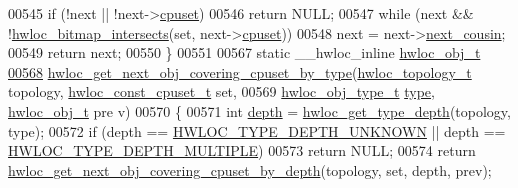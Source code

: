 \begin{DoxyCode}
00545   \textcolor{keywordflow}{if} (!next || !next->\hyperlink{a00016_a67925e0f2c47f50408fbdb9bddd0790f}{cpuset})
00546     \textcolor{keywordflow}{return} NULL;
00547   \textcolor{keywordflow}{while} (next && !\hyperlink{a00065_ga575c27953709a8cb9a047aae65157526}{hwloc_bitmap_intersects}(\textcolor{keyword}{set}, next->\hyperlink{a00016_a67925e0f2c47f50408fbdb9bddd0790f}{cpuset}))
00548     next = next->\hyperlink{a00016_a85a788017457129589318b6c39451acf}{next_cousin};
00549   \textcolor{keywordflow}{return} next;
00550 \}
00551 
00567 \textcolor{keyword}{static} \_\_hwloc\_inline \hyperlink{a00016}{hwloc_obj_t}
\hypertarget{a00031_source_l00568}{}\hyperlink{a00056_ga5915ea30f326676b3a4cfff371ce04d1}{00568} \hyperlink{a00056_ga5915ea30f326676b3a4cfff371ce04d1}{hwloc_get_next_obj_covering_cpuset_by_type}(\hyperlink{a00039_ga9d1e76ee15a7dee158b786c30b6a6e38}{hwloc_topology_t} topology, 
      \hyperlink{a00040_ga1f784433e9b606261f62d1134f6a3b25}{hwloc_const_cpuset_t} \textcolor{keyword}{set},
00569                                            \hyperlink{a00041_gacd37bb612667dc437d66bfb175a8dc55}{hwloc_obj_type_t} \hyperlink{a00016_acc4f0803f244867e68fe0036800be5de}{type}, \hyperlink{a00016}{hwloc_obj_t} pre
      v)
00570 \{
00571   \textcolor{keywordtype}{int} \hyperlink{a00016_a9d82690370275d42d652eccdea5d3ee5}{depth} = \hyperlink{a00046_gaea7c64dd59467f5201ba87712710b14d}{hwloc_get_type_depth}(topology, type);
00572   \textcolor{keywordflow}{if} (depth == \hyperlink{a00046_ggaf4e663cf42bbe20756b849c6293ef575a0565ab92ab72cb0cec91e23003294aad}{HWLOC_TYPE_DEPTH_UNKNOWN} || depth == \hyperlink{a00046_ggaf4e663cf42bbe20756b849c6293ef575ae99465995cacde6c210d5fc2e409798c}{HWLOC_TYPE_DEPTH_MULTIPLE})
00573     \textcolor{keywordflow}{return} NULL;
00574   \textcolor{keywordflow}{return} \hyperlink{a00056_ga2f9a4ec15e9cfae8c21501257a51ce5b}{hwloc_get_next_obj_covering_cpuset_by_depth}(topology, \textcolor{keyword}{set}, depth, prev);
      

\end{DoxyCode}
